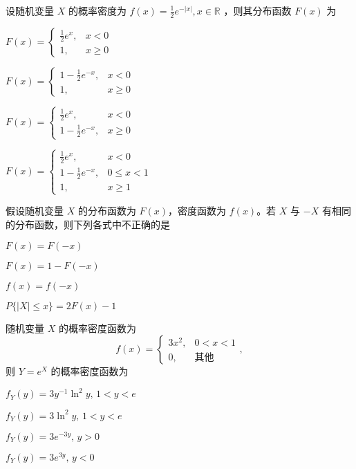 \documentclass{exam-zh}
\begin{document}
\begin{question}
  设随机变量 $X$ 的概率密度为  
  $f(x) = \frac{1}{2} e^{-|x|}, x \in \mathbb{R}$  
  ，则其分布函数 $F(x)$ 为 \paren[C]
  \begin{choices}
    \item 
    $F(x) =
    \begin{cases} 
    \frac{1}{2} e^x, & x < 0 \\
    1, & x \geq 0 
    \end{cases}$
    
    \item 
    $F(x) =
    \begin{cases} 
    1 - \frac{1}{2} e^{-x}, & x < 0 \\
    1, & x \geq 0 
    \end{cases}$
    
    \item 
    $F(x) =
    \begin{cases} 
    \frac{1}{2} e^x, & x < 0 \\
    1 - \frac{1}{2} e^{-x}, & x \geq 0 
    \end{cases}$
    
    \item 
    $F(x) =
    \begin{cases} 
    \frac{1}{2} e^x, & x < 0 \\
    1 - \frac{1}{2} e^{-x}, & 0 \leq x < 1 \\
    1, & x \geq 1 
    \end{cases}$
  \end{choices}
\end{question}

\begin{question}
  假设随机变量 $X$ 的分布函数为 $F(x)$，密度函数为 $f(x)$。若 $X$ 与 $-X$ 有相同的分布函数，则下列各式中不正确的是 \paren[A]
  \begin{choices}
    \item $F(x) = F(-x)$  
    \item $F(x) = 1 - F(-x)$  
    \item $f(x) = f(-x)$  
    \item $P\{ |X| \leq x\} = 2F(x) - 1$  
  \end{choices}
\end{question}

\begin{question}
  随机变量 $X$ 的概率密度函数为  
  $$f(x) = 
  \begin{cases} 
  3x^2, & 0 < x < 1 \\ 
  0, & \text{其他} 
  \end{cases},$$  
  则 $Y = e^{X}$ 的概率密度函数为 \paren[A]
  \begin{choices}
    \item $f_Y(y) = 3y^{-1} \ln^2 y, \, 1 < y < e$  
    \item $f_Y(y) = 3\ln^2 y, \, 1 < y < e$  
    \item $f_Y(y) = 3e^{-3y}, \, y > 0$  
    \item $f_Y(y) = 3e^{3y}, \, y < 0$  
  \end{choices}
\end{question}
\end{document}
